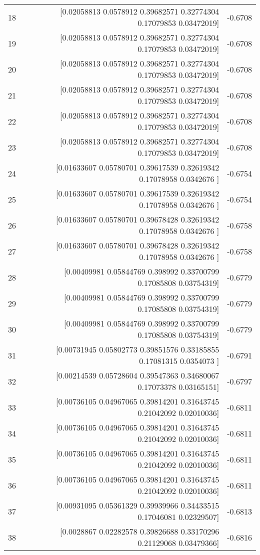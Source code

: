 \begin{longtable}{lrr}
18 & [0.02058813 0.0578912  0.39682571 0.32774304 0.17079853 0.03472019] & -0.6708 \\
19 & [0.02058813 0.0578912  0.39682571 0.32774304 0.17079853 0.03472019] & -0.6708 \\
20 & [0.02058813 0.0578912  0.39682571 0.32774304 0.17079853 0.03472019] & -0.6708 \\
21 & [0.02058813 0.0578912  0.39682571 0.32774304 0.17079853 0.03472019] & -0.6708 \\
22 & [0.02058813 0.0578912  0.39682571 0.32774304 0.17079853 0.03472019] & -0.6708 \\
23 & [0.02058813 0.0578912  0.39682571 0.32774304 0.17079853 0.03472019] & -0.6708 \\
24 & [0.01633607 0.05780701 0.39617539 0.32619342 0.17078958 0.0342676 ] & -0.6754 \\
25 & [0.01633607 0.05780701 0.39617539 0.32619342 0.17078958 0.0342676 ] & -0.6754 \\
26 & [0.01633607 0.05780701 0.39678428 0.32619342 0.17078958 0.0342676 ] & -0.6758 \\
27 & [0.01633607 0.05780701 0.39678428 0.32619342 0.17078958 0.0342676 ] & -0.6758 \\
28 & [0.00409981 0.05844769 0.398992   0.33700799 0.17085808 0.03754319] & -0.6779 \\
29 & [0.00409981 0.05844769 0.398992   0.33700799 0.17085808 0.03754319] & -0.6779 \\
30 & [0.00409981 0.05844769 0.398992   0.33700799 0.17085808 0.03754319] & -0.6779 \\
31 & [0.00731945 0.05802773 0.39851576 0.33185855 0.17081315 0.0354073 ] & -0.6791 \\
32 & [0.00214539 0.05728604 0.39547363 0.34680067 0.17073378 0.03165151] & -0.6797 \\
33 & [0.00736105 0.04967065 0.39814201 0.31643745 0.21042092 0.02010036] & -0.6811 \\
34 & [0.00736105 0.04967065 0.39814201 0.31643745 0.21042092 0.02010036] & -0.6811 \\
35 & [0.00736105 0.04967065 0.39814201 0.31643745 0.21042092 0.02010036] & -0.6811 \\
36 & [0.00736105 0.04967065 0.39814201 0.31643745 0.21042092 0.02010036] & -0.6811 \\
37 & [0.00931095 0.05361329 0.39939966 0.34433515 0.17046081 0.02329507] & -0.6813 \\
38 & [0.0028867  0.02282578 0.39826688 0.33170296 0.21129068 0.03479366] & -0.6816 \\

\end{longtable}
